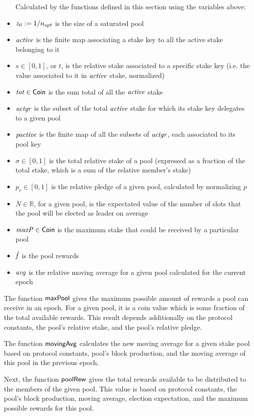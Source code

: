 \begin{itemize}
Calculated by the functions defined in this section using the variables above:
\item $\mathit{z_0} := 1/n_{opt}$ is the size of a saturated pool
\item $\mathit{active}$ is the finite map associating a stake key to all the
active stake belonging to it
\item $s \in [0,1]$, or $t$, is the relative stake associated to a specific stake key
(i.e. the value associated to it in $\mathit{active}$ stake, normalized)
\item $\mathit{tot} \in \mathsf{Coin}$ is the sum total of all the $\mathit{active}$ stake
\item $\mathit{actgr}$ is the subset of the total $\mathit{active}$ stake
for which its stake key delegates to a given pool
\item $\mathit{pactive}$ is the finite map of all the subsets of $\mathit{actgr}$,
each associated to its pool key
\item $\sigma \in [0,1]$ is the total relative stake of a pool (expressed as a fraction of
the total stake, which is a sum of the relative member's stake)
\item $p_r \in [0,1]$ is the relative pledge of a given pool, calculated by normalizing $p$
\item $\overline{N} \in \mathbb{R}$, for a given pool, is the expectated value of the number
of slots that the pool will be elected as leader on average
\item $\mathit{maxP} \in \mathsf{Coin}$ is the maximum stake that could be received by a particular
pool
\item $\mathit{\hat{f}}$ is the pool rewards
\item $\mathit{avg}$ is the relative moving average for a given pool calculated for
the current epoch
\end{itemize}

The function $\mathsf{maxPool}$ gives the maximum possible amount of rewards a pool
can receive in an epoch. For a given pool, it is a coin value which is some fraction of
the total available rewards. This result depends additionally on the protocol
constants, the pool's relative stake, and the pool's relative pledge.

The function $\mathsf{movingAvg}$ calculates the new moving average for a
given stake pool based on protocol constants, pool's block production, and
the moving average of this pool in the previous epoch.

Next, the function $\mathsf{poolRew}$ gives the total rewards available to be distributed
to the members of the given pool. This value is based on protocol constants,
the pool's block production, moving average, election expectation, and the maximum
possible rewards for this pool.

